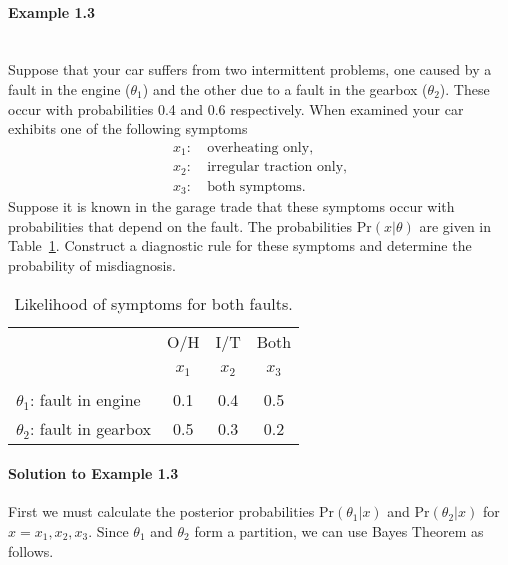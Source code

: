 \newpage


\paragraph{Example 1.3}{~\\
Suppose that your car suffers from two intermittent problems, one
caused by a fault in the engine ($\theta_1$) and the other due to a
fault in the gearbox ($\theta_2$). These occur with probabilities 0.4
and 0.6 respectively. When examined your car exhibits one of the
following symptoms
\begin{align*}
x_1:&~\text{overheating only}, \\
x_2:&~\text{irregular traction only}, \\
x_3:&~\text{both symptoms}.
\end{align*}
Suppose it is known in the garage trade that these symptoms occur with
probabilities that depend on the fault. The probabilities
$\text{Pr}(x|\theta)$ are given in Table~\ref{tab:garagelik}. Construct a
diagnostic rule for these symptoms and determine the probability of
misdiagnosis.
\begin{table}[h]
\bigskip

\begin{tabular}{|l|ccc|}
\cline{2-4}
\multicolumn{1}{c|}{~}& O/H & I/T & Both \\
\multicolumn{1}{c|}{~}& $x_1$ & $x_2$ & $x_3$ \\
\hline
$\theta_1$: fault in engine & 0.1 & 0.4 & 0.5 \\
\hline
$\theta_2$: fault in gearbox & 0.5 & 0.3 & 0.2 \\
\hline
\end{tabular}
\caption{Likelihood of symptoms for both faults.}
\label{tab:garagelik}

\end{table}



\paragraph{Solution to Example 1.3}{
    
}

{
    
    First we must calculate the posterior probabilities $\text{Pr}(\theta_1|x)$
    and $\text{Pr}(\theta_2|x)$ for $x=x_1,x_2,x_3$. Since $\theta_1$ and
    $\theta_2$ form a partition, we can use Bayes Theorem as follows.
    
}}
